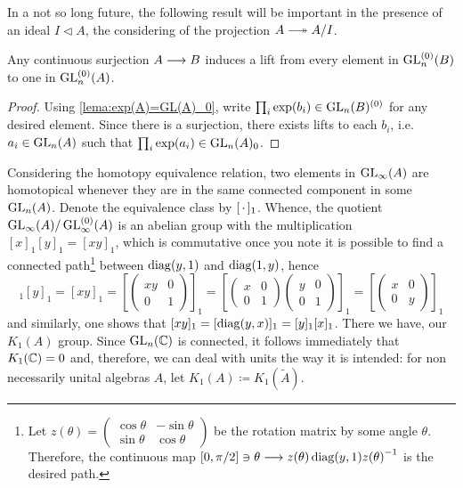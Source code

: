 In a not so long future, the following result will be important in the presence of an ideal $I\triangleleft A$, the considering of the projection $A \longtwoheadrightarrow A/I$.
\begin{corolario}
    \label{corol:lift by surjection}
    Any continuous surjection $A \longrightarrow B$ induces a lift from every element in $\operatorname{GL}_n^{(0)}(B)$ to one in $\operatorname{GL}_n^{(0)}(A)$.
    \begin{proof}
        Using \ref*{lema:exp(A)=GL(A)_0}, write $\prod_i \exp(b_i) \in \operatorname{GL}_n(B)^{(0)}$ for any desired element. Since there is a surjection, there exists lifts to each $b_i$, i.e. $a_i \in \operatorname{GL}_n(A)$ such that $\prod_i \exp(a_i) \in \operatorname{GL}_n(A)_{0}$.
    \end{proof}
\end{corolario}

Considering the homotopy equivalence relation, two elements in $\operatorname{GL}_\infty(A)$ are homotopical whenever they are in the same connected component in some $\operatorname{GL}_n(A)$. Denote the equivalence class by $[\operatorname{\,\cdot\,}]_1$. Whence, the quotient $\operatorname{GL}_\infty(A)/\operatorname{GL}_\infty^{(0)}(A)$ is an abelian group with the multiplication $[x]_1[y]_1 = [xy]_1$, which is commutative once you note it is possible to find a connected path\footnote{
        Let $z(\theta) = \left(\begin{smallmatrix}
            \cos \theta & -\sin \theta \\ \sin \theta & \cos \theta
        \end{smallmatrix}\right)$ be the rotation matrix by some angle $\theta$. Therefore, the continuous map $[0,\pi/2] \ni \theta \longrightarrow z(\theta) \operatorname{diag}(y,1) {z(\theta)}^{-1}$ is the desired path.
    } between $\operatorname{diag}(y,1)$ and $\operatorname{diag}(1,y)$, hence 
    \begin{equation*}
        [x]_1[y]_1 = [xy]_1 = \left[\begin{pmatrix}
            xy & 0 \\ 0 & 1
        \end{pmatrix}\right]_1= \left[\begin{pmatrix}
            x & 0 \\ 0 & 1
        \end{pmatrix}\begin{pmatrix}
            y & 0 \\ 0 & 1
        \end{pmatrix}\right]_1 = \left[\begin{pmatrix}
            x & 0 \\ 0 & y
        \end{pmatrix}\right]_1 
    \end{equation*}    
    and similarly, one shows that $[xy]_1 = [\operatorname{diag}(y,x)]_1 = [y]_1[x]_1$. There we have, our $K_1(A)$ group. Since $\operatorname{GL}_n(\operatorname{\mathbb{C}})$ is connected, it follows immediately that $K_1(\operatorname{\mathbb{C}}) = 0$ and, therefore, we can deal with units the way it is intended: for non necessarily unital algebras $A$, let $K_1(A) \coloneqq K_1(\widetilde{A})$.

